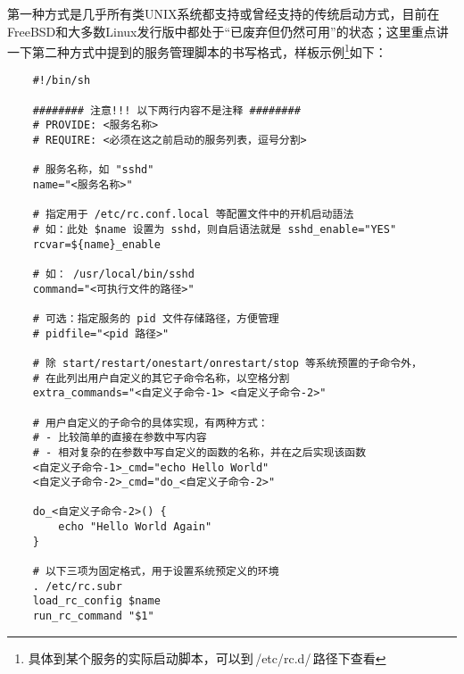 第一种方式是几乎所有类UNIX系统都支持或曾经支持的传统启动方式，目前在FreeBSD和大多数Linux发行版中都处于``已废弃但仍然可用''的状态；这里重点讲一下第二种方式中提到的服务管理脚本的书写格式，样板示例\footnote{具体到某个服务的实际启动脚本，可以到\,/etc/rc.d/\,路径下查看}如下：

\begin{lstlisting}
    #!/bin/sh

    ######## 注意!!! 以下两行内容不是注释 ########
    # PROVIDE: <服务名称>
    # REQUIRE: <必须在这之前启动的服务列表，逗号分割>

    # 服务名称，如 "sshd"
    name="<服务名称>"

    # 指定用于 /etc/rc.conf.local 等配置文件中的开机启动語法
    # 如：此处 $name 设置为 sshd，则自启语法就是 sshd_enable="YES"
    rcvar=${name}_enable

    # 如： /usr/local/bin/sshd
    command="<可执行文件的路径>"

    # 可选：指定服务的 pid 文件存储路径，方便管理
    # pidfile="<pid 路径>"

    # 除 start/restart/onestart/onrestart/stop 等系统预置的子命令外，
    # 在此列出用户自定义的其它子命令名称，以空格分割
    extra_commands="<自定义子命令-1> <自定义子命令-2>"

    # 用户自定义的子命令的具体实现，有两种方式：
    # - 比较简单的直接在参数中写内容
    # - 相对复杂的在参数中写自定义的函数的名称，并在之后实现该函数
    <自定义子命令-1>_cmd="echo Hello World"
    <自定义子命令-2>_cmd="do_<自定义子命令-2>"

    do_<自定义子命令-2>() {
        echo "Hello World Again"
    }

    # 以下三项为固定格式，用于设置系统预定义的环境
    . /etc/rc.subr
    load_rc_config $name
    run_rc_command "$1"
\end{lstlisting}